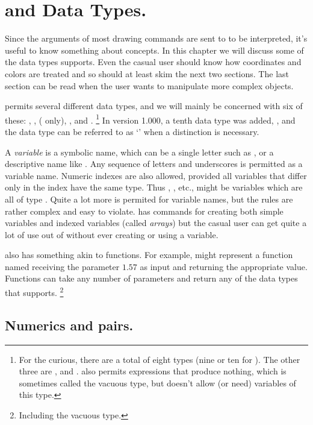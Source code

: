 \documentclass[letterpaper]{article}
\begin{document}
\clearpage
\chapter{\CMF{} and \CMP{} Data Types.}\label{types}

Since the arguments of most \mfp{} drawing commands are sent to \MF{} to
be interpreted, it's useful to know something about \MF{} concepts. In
this chapter we will discuss some of the data types \MF{} supports.
Even the casual user should know how coordinates and colors are treated
and so should at least skim the next two sections. The last
section can be read when the user wants to manipulate more complex
objects.

\CMF{} permits  several different data types, and we will mainly be
concerned with six of these: , ,  (\MP{}
only), ,  and .%
    \footnote{For the curious, there are a total of eight types (nine or
    ten for \MP{}). The other three are ,  and
    . \MF{} also permits expressions that produce nothing, which
    is sometimes called the vacuous type, but doesn't allow (or need)
    variables of this type.}
In \MP{} version 1.000, a tenth data type was added, , and
the  data type can be referred to as `' when a
distinction is necessary.

A \emph{variable} is a symbolic name, which can be a single letter such
as , or a descriptive name like . Any sequence of
letters and underscores is permitted as a variable name. Numeric indexes
are also allowed, provided all variables that differ only in the index
have the same type. Thus , , etc., might be variables
which are all of type . Quite a lot more is permited for variable
names, but the rules are rather complex and easy to violate. \Mfp{} has
commands for creating both simple variables and indexed variables
(called \emph{arrays}) but the casual user can get quite a lot of use
out of \mfp{} without ever creating or using a \MF{} variable.

\CMF{} also has something akin to functions. For example, 
might represent a function named  receiving the parameter
$1.57$ as input and returning the appropriate value. Functions
can take any number of parameters and return any of the data types that
\MF{} supports.%
    \footnote{Including the vacuous type.}


\section{Numerics and pairs.}\label{pairs}
\end{document}
